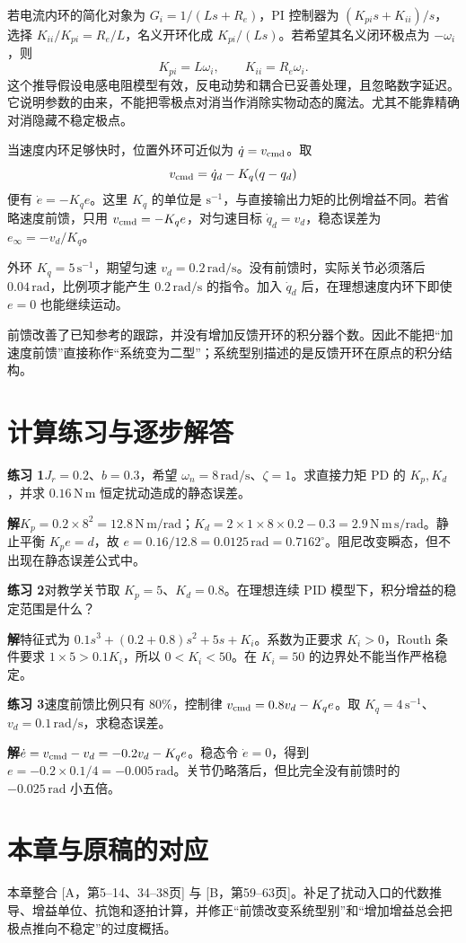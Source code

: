 若电流内环的简化对象为 $G_i=1/(Ls+R_e)$，PI 控制器为 $(K_{pi}s+K_{ii})/s$，选择 $K_{ii}/K_{pi}=R_e/L$，名义开环化成 $K_{pi}/(Ls)$。若希望其名义闭环极点为 $-\omega_i$，则
\[
K_{pi}=L\omega_i,\qquad K_{ii}=R_e\omega_i.
\]
这个推导假设电感电阻模型有效，反电动势和耦合已妥善处理，且忽略数字延迟。它说明参数的由来，不能把零极点对消当作消除实物动态的魔法。尤其不能靠精确对消隐藏不稳定极点。

当速度内环足够快时，位置外环可近似为 $\dot q=v_{\rm cmd}$。取
\begin{equation}
v_{\rm cmd}=\dot q_d-K_q(q-q_d)
\end{equation}
便有 $\dot e=-K_qe$。这里 $K_q$ 的单位是 $\mathrm{s^{-1}}$，与直接输出力矩的比例增益不同。若省略速度前馈，只用 $v_{\rm cmd}=-K_qe$，对匀速目标 $\dot q_d=v_d$，稳态误差为 $e_\infty=-v_d/K_q$。

\begin{examplebox}[算例 11F 速度前馈消除跟随落后]
外环 $K_q=5\,\mathrm{s^{-1}}$，期望匀速 $v_d=0.2\,\mathrm{rad/s}$。没有前馈时，实际关节必须落后 $0.04\,\mathrm{rad}$，比例项才能产生 $0.2\,\mathrm{rad/s}$ 的指令。加入 $\dot q_d$ 后，在理想速度内环下即使 $e=0$ 也能继续运动。

前馈改善了已知参考的跟踪，并没有增加反馈开环的积分器个数。因此不能把“加速度前馈”直接称作“系统变为二型”；系统型别描述的是反馈开环在原点的积分结构。
\end{examplebox}

\section{计算练习与逐步解答}

\textbf{练习 1}\quad $J_r=0.2$、$b=0.3$，希望 $\omega_n=8\,\mathrm{rad/s}$、$\zeta=1$。求直接力矩 PD 的 $K_p,K_d$，并求 $0.16\,\mathrm{N\,m}$ 恒定扰动造成的静态误差。

\textbf{解}\quad $K_p=0.2\times8^2=12.8\,\mathrm{N\,m/rad}$；$K_d=2\times1\times8\times0.2-0.3=2.9\,\mathrm{N\,m\,s/rad}$。静止平衡 $K_pe=d$，故 $e=0.16/12.8=0.0125\,\mathrm{rad}=0.7162^\circ$。阻尼改变瞬态，但不出现在静态误差公式中。

\textbf{练习 2}\quad 对教学关节取 $K_p=5$、$K_d=0.8$。在理想连续 PID 模型下，积分增益的稳定范围是什么？

\textbf{解}\quad 特征式为 $0.1s^3+(0.2+0.8)s^2+5s+K_i$。系数为正要求 $K_i>0$，Routh 条件要求 $1\times5>0.1K_i$，所以 $0<K_i<50$。在 $K_i=50$ 的边界处不能当作严格稳定。

\textbf{练习 3}\quad 速度前馈比例只有 80\%，控制律 $v_{\rm cmd}=0.8v_d-K_qe$。取 $K_q=4\,\mathrm{s^{-1}}$、$v_d=0.1\,\mathrm{rad/s}$，求稳态误差。

\textbf{解}\quad $\dot e=v_{\rm cmd}-v_d=-0.2v_d-K_qe$。稳态令 $\dot e=0$，得到 $e=-0.2\times0.1/4=-0.005\,\mathrm{rad}$。关节仍略落后，但比完全没有前馈时的 $-0.025\,\mathrm{rad}$ 小五倍。

\section*{本章与原稿的对应}
本章整合 [A，第5--14、34--38页] 与 [B，第59--63页]。补足了扰动入口的代数推导、增益单位、抗饱和逐拍计算，并修正“前馈改变系统型别”和“增加增益总会把极点推向不稳定”的过度概括。
